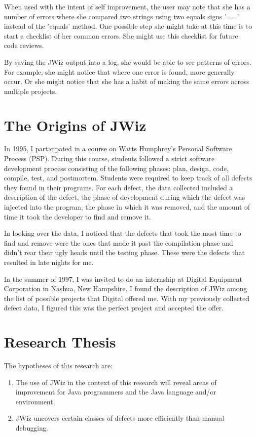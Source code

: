 When used with the intent of self improvement, the user may note that she
has a number of errors where she compared two strings using two equals
signs '==' instead of the 'equals' method. One possible step she might take
at this time is to start a checklist of her common errors.  She might use
this checklist for future code reviews.

By saving the JWiz output into a log, she would be able to see patterns of
errors.  For example, she might notice that where one error is found, more
generally occur.  Or she might notice that she has a habit of making the
same errors across multiple projects.

\section{The Origins of JWiz}
In 1995, I participated in a course on Watts Humphrey's Personal Software
Process (PSP)\cite{Humphrey95}.  During this course, students followed a
strict software development process consisting of the following phases:
plan, design, code, compile, test, and postmortem.  Students were required
to keep track of all defects they found in their programs.  For each
defect, the data collected included a description of the defect, the phase
of development during which the defect was injected into the program, the
phase in which it was removed, and the amount of time it took the developer
to find and remove it.

In looking over the data, I noticed that the defects that took the most
time to find and remove were the ones that made it past the compilation
phase and didn't rear their ugly heads until the testing phase.  These were
the defects that resulted in late nights for me.

In the summer of 1997, I was invited to do an internship at Digital
Equipment Corporation in Nashua, New Hampshire.  I found
the description of JWiz among the list of possible projects that
Digital offered me.  With my previously collected defect data, I figured
this was the perfect project and accepted the offer.

\section{Research Thesis} 
The hypotheses of this research are:
\begin{enumerate}
\item The use of JWiz in the context of this research will reveal areas of
  improvement for Java programmers and the Java language and/or
  environment.
\item JWiz uncovers certain classes of defects more efficiently than manual
debugging.
\end{enumerate}

